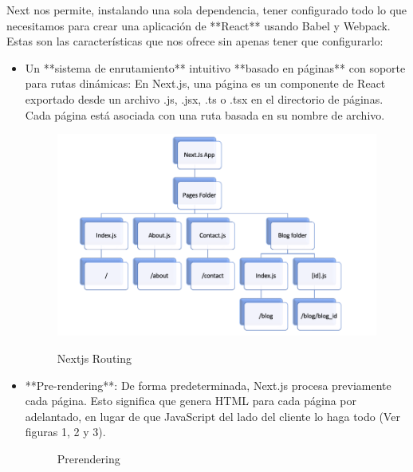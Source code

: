 \documentclass[12pt,twoside,titlepage]{report}
\begin{document}
Next nos permite, instalando una sola dependencia, tener configurado todo lo que necesitamos para crear una aplicación de **React** usando Babel y Webpack.  Estas son las características que nos ofrece sin apenas tener que configurarlo:

\begin{itemize}
    \item Un **sistema de enrutamiento** intuitivo **basado en páginas** con soporte para rutas dinámicas: En Next.js, una página es un componente de React exportado desde un archivo .js, .jsx, .ts o .tsx en el directorio de páginas. Cada página está asociada con una ruta basada en su nombre de archivo.
    \begin{figure}[H]
        \centering
        \includegraphics[scale=0.4]{nextjs_routing}
        \label{fig:nextjs_routing}
        \caption{Nextjs Routing}
    \end{figure}
    
    \item **Pre-rendering**: De forma predeterminada, Next.js procesa previamente cada página. Esto significa que genera HTML para cada página por adelantado, en lugar de que JavaScript del lado del cliente lo haga todo (Ver figuras 1, 2 y 3). 
    \begin{figure}[H]
        \centering
        \caption{Prerendering}
        \label{f:Prerendering}
       \end{figure}


\end{itemize}
\end{document}
